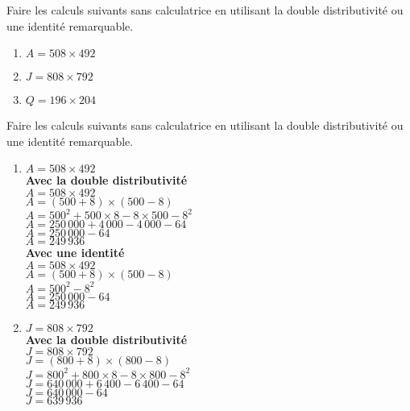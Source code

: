 \begin{exercice*}
    Faire les calculs suivants sans calculatrice en utilisant la double distributivité ou une identité remarquable.
    \begin{enumerate}
        \item $A=508\times 492$
        \item $J=808\times 792$
        \item $Q=196\times 204$
    \end{enumerate}
\end{exercice*}
\begin{corrige}
    Faire les calculs suivants sans calculatrice en utilisant la double distributivité ou une identité remarquable.

    \begin{enumerate}
        \item $A=508\times 492$\\
        {\red     
            \textbf{Avec la double distributivité}\\
            $A = 508\times 492$\\
            $A = (500 + 8)\times (500 - 8)$\\
            $A = 500^2 + 500\times 8 - 8\times 500 - 8^2$\\
            $A = 250\,000 + 4\,000 - 4\,000   - 64$\\
            $A = 250\,000  - 64$\\
            $A = 249\,936$\\

            \medskip
            \textbf{Avec une identité}\\
            $A = 508\times 492$\\
            $A = (500 + 8)\times (500 - 8) $\\
            $A = 500^2  -  8^2$\\
            $A = 250\,000  -  64$\\                        
            $A = 249\,936$\\
        }
        \item $J=808\times 792$\\
        {\red
            \textbf{Avec la double distributivité}\\
            $J = 808\times 792$\\
            $J = (800 + 8)\times (800 - 8)$\\
            $J = 800^2 + 800\times 8 - 8\times 800 - 8^2$\\
            $J = 640\,000 + 6\,400 - 6\,400   - 64$\\
            $J = 640\,000  - 64$\\
            $J = 639\,936$\\

}
\end{enumerate}
\end{corrige}
